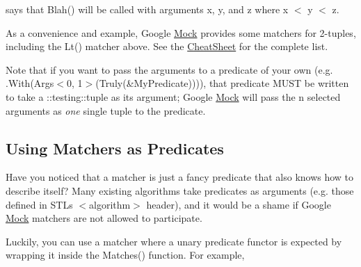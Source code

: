 says that {\ttfamily Blah()} will be called with arguments {\ttfamily x}, {\ttfamily y}, and {\ttfamily z} where {\ttfamily x $<$ y $<$ z}.

As a convenience and example, Google \mbox{\hyperlink{class_mock}{Mock}} provides some matchers for 2-\/tuples, including the {\ttfamily Lt()} matcher above. See the \mbox{\hyperlink{_obj__test_2lib_2googletest-release-1_88_81_2googlemock_2docs_2_cheat_sheet_8md}{Cheat\+Sheet}} for the complete list.

Note that if you want to pass the arguments to a predicate of your own (e.\+g. {\ttfamily .With(Args$<$0, 1$>$(Truly(\&\+My\+Predicate)))}), that predicate M\+U\+ST be written to take a {\ttfamily \+::testing\+::tuple} as its argument; Google \mbox{\hyperlink{class_mock}{Mock}} will pass the {\ttfamily n} selected arguments as {\itshape one} single tuple to the predicate.

\subsection*{Using Matchers as Predicates}

Have you noticed that a matcher is just a fancy predicate that also knows how to describe itself? Many existing algorithms take predicates as arguments (e.\+g. those defined in S\+TL\textquotesingle{}s {\ttfamily $<$algorithm$>$} header), and it would be a shame if Google \mbox{\hyperlink{class_mock}{Mock}} matchers are not allowed to participate.

Luckily, you can use a matcher where a unary predicate functor is expected by wrapping it inside the {\ttfamily Matches()} function. For example,


\begin{DoxyCode}{0}
\DoxyCodeLine{\textcolor{preprocessor}{\#include <algorithm>}}
\DoxyCodeLine{\textcolor{preprocessor}{\#include <vector>}}
\DoxyCodeLine{}
\DoxyCodeLine{\textcolor{comment}{// How many elements in v are >= 10?}}
\end{DoxyCode}


